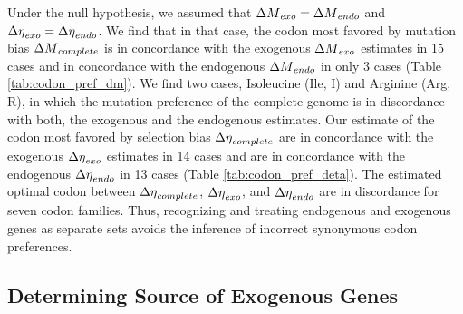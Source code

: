 \documentclass[12pt]{article}
\begin{document}
Under the null hypothesis, we assumed that ${\Delta M}_{exo} = {\Delta M}_{endo}$ and ${\Delta \eta}_{exo} = {\Delta \eta}_{endo}$.
We find that in that case, the codon most favored by mutation bias ${\Delta M}_{complete}$ is in concordance with the exogenous ${\Delta M}_{exo}$ estimates in 15 cases and in concordance with the endogenous ${\Delta M}_{endo}$ in only 3 cases (Table \ref{tab:codon_pref_dm}).
We find two cases, Isoleucine (Ile, I) and Arginine (Arg, R), in which the mutation preference of the complete genome is in discordance with both, the exogenous and the endogenous estimates.
Our estimate of the codon most favored by selection bias ${\Delta \eta}_{complete}$ are in concordance with the exogenous ${\Delta \eta}_{exo}$ estimates in 14 cases and are in concordance with the endogenous ${\Delta \eta}_{endo}$ in 13 cases (Table \ref{tab:codon_pref_deta}).
The estimated optimal codon between ${\Delta \eta}_{complete}$, ${\Delta \eta}_{exo}$, and ${\Delta \eta}_{endo}$ are in discordance for seven codon families.
Thus, recognizing and treating endogenous and exogenous genes as separate sets avoids the inference of incorrect synonymous codon preferences.

\subsection*{Determining Source of Exogenous Genes}
\end{document}
